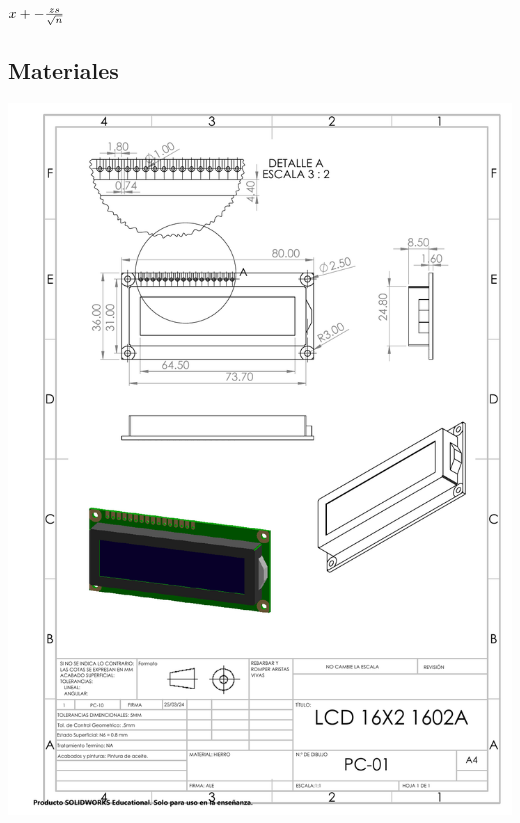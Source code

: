 \begin{center} 

${\-x}+-{\frac{zs}{\sqrt{n}}}$

\end{center}

\subsection{Materiales}

\begin{center}
\includegraphics[width=.9\textwidth]{22/img/lcdDibujo.PDF}~\\[15cm]


\end{center}

